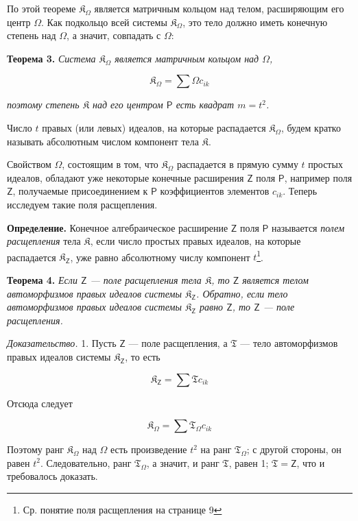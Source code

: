 \documentclass[11pt]{article}
\newcommand{\srcfn}[2]{\footnote{#2}}
\begin{document}
По этой теореме \(\mathfrak K_\Omega\) является матричным кольцом над телом, расширяющим его центр \(\Omega\). Как подкольцо всей системы \(\mathfrak K_\Omega\), это тело должно иметь конечную степень над \(\Omega\), а значит, совпадать с \(\Omega\):

\textbf{Теорема 3.} \emph{Система \(\mathfrak K_\Omega\) является матричным кольцом над \(\Omega\),}

\[
\mathfrak K_\Omega=\sum\Omega c_{ik}
\]

\emph{поэтому степень \(\mathfrak K\) над его центром \(\mathsf P\) есть квадрат \(m=t^2\).}

Число \(t\) правых (или левых) идеалов, на которые распадается \(\mathfrak K_\Omega\), будем кратко называть абсолютным числом компонент тела \(\mathfrak K\).

Свойством \(\Omega\), состоящим в том, что \(\mathfrak K_\Omega\) распадается в прямую сумму \(t\) простых идеалов, обладают уже некоторые конечные расширения \(\mathsf{Z}\) поля \(\mathsf P\), например поля \(\mathsf{Z}\), получаемые присоединением к \(\mathsf P\) коэффициентов элементов \(c_{ik}\). Теперь исследуем такие поля расщепления.

\textbf{Определение.} Конечное алгебраическое расширение \(\mathsf{Z}\) поля \(\mathsf P\) называется \emph{полем расщепления} тела \(\mathfrak K\), если число простых правых идеалов, на которые распадается \(\mathfrak K_{\mathsf{Z}}\), уже равно абсолютному числу компонент \(t\)\srcfn{1}{Ср. понятие поля расщепления на странице 9}.

\textbf{Теорема 4.} \emph{Если \(\mathsf{Z}\) --- поле расщепления тела \(\mathfrak K\), то \(\mathsf{Z}\) является телом автоморфизмов правых идеалов системы \(\mathfrak K_{\mathsf{Z}}\). Обратно, если тело автоморфизмов правых идеалов системы \(\mathfrak K_{\mathsf{Z}}\) равно \(\mathsf{Z}\), то \(\mathsf{Z}\) --- поле расщепления.}

\emph{Доказательство.} 1. Пусть \(\mathsf{Z}\) --- поле расщепления, а \(\mathfrak T\) --- тело автоморфизмов правых идеалов системы \(\mathfrak K_{\mathsf{Z}}\), то есть

\[
\mathfrak K_{\mathsf{Z}}=\sum\mathfrak T c_{ik}
\]

Отсюда следует

\[
\mathfrak K_\Omega=\sum\mathfrak T_\Omega c_{ik}
\]

Поэтому ранг \(\mathfrak K_\Omega\) над \(\Omega\) есть произведение \(t^2\) на ранг \(\mathfrak T_\Omega\); с другой стороны, он равен \(t^2\). Следовательно, ранг \(\mathfrak T_\Omega\), а значит, и ранг \(\mathfrak T\), равен 1; \(\mathfrak T=\mathsf{Z}\), что и требовалось доказать.
\end{document}
